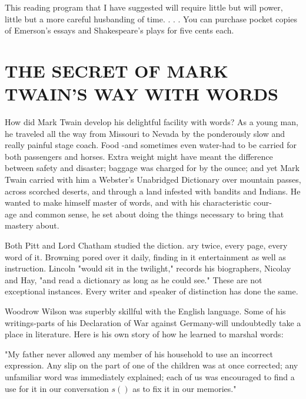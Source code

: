 \documentclass[10pt]{article}
\begin{document}
This reading program that I have suggested will require little but will power, little but a more careful husbanding of time. . . . You can purchase pocket copies of Emerson's essays and Shakespeare's plays for five cents each.

\section*{THE SECRET OF MARK TWAIN'S WAY WITH WORDS}
How did Mark Twain develop his delightful facility with words? As a young man, he traveled all the way from Missouri to Nevada by the ponderously slow and really painful stage coach. Food -and sometimes even water-had to be carried for both passengers and horses. Extra weight might have meant the difference between safety and disaster; baggage was charged for by the ounce; and yet Mark Twain carried with him a Webster's Unabridged Dictionary over mountain passes, across scorched deserts, and through a land infested with bandits and Indians. He wanted to make himself master of words, and with his characteristic cour-\\
age and common sense, he set about doing the things necessary to bring that mastery about.

Both Pitt and Lord Chatham studied the diction. ary twice, every page, every word of it. Browning pored over it daily, finding in it entertainment as well as instruction. Lincoln "would sit in the twilight," records his biographers, Nicolay and Hay, "and read a dictionary as long as he could see." These are not exceptional instances. Every writer and speaker of distinction has done the same.

Woodrow Wilson was superbly skillful with the English language. Some of his writings-parts of his Declaration of War against Germany-will undoubtedly take a place in literature. Here is his own story of how he learned to marshal words:

\begin{displayquote}
"My father never allowed any member of his household to use an incorrect expression. Any slip on the part of one of the children was at once corrected; any unfamiliar word was immediately explained; each of us was encouraged to find a use for it in our conversation $s()$ as to fix it in our memories."
\end{displayquote}
\end{document}
